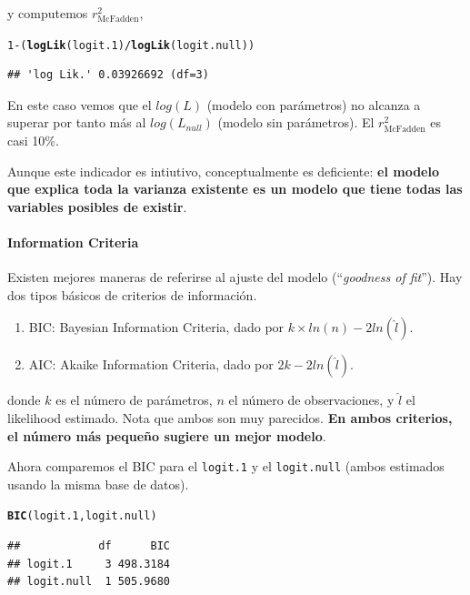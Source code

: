 \documentclass[onesided]{article}\usepackage[]{graphicx}\usepackage[]{color}
\makeatletter
\newcommand{\hlnum}[1]{\textcolor[rgb]{0.686,0.059,0.569}{#1}}%
\newcommand{\hlopt}[1]{\textcolor[rgb]{0,0,0}{#1}}%
\newcommand{\hlstd}[1]{\textcolor[rgb]{0.345,0.345,0.345}{#1}}%
\newcommand{\hlkwd}[1]{\textcolor[rgb]{0.737,0.353,0.396}{\textbf{#1}}}%
\newenvironment{kframe}{%
 \def\at@end@of@kframe{}%
 \ifinner\ifhmode%
  \def\at@end@of@kframe{\end{minipage}}%
  \begin{minipage}{\columnwidth}%
 \fi\fi%
 \def\FrameCommand##1{\hskip\@totalleftmargin \hskip-\fboxsep
 \colorbox{shadecolor}{##1}\hskip-\fboxsep
     \hskip-\linewidth \hskip-\@totalleftmargin \hskip\columnwidth}%
 \MakeFramed {\advance\hsize-\width
   \@totalleftmargin\z@ \linewidth\hsize
   \@setminipage}}%
 {\par\unskip\endMakeFramed%
 \at@end@of@kframe}
\newenvironment{knitrout}{}{} %
\makeatother
\begin{document}
y computemos $r^{2}_{\text{McFadden}}$,

\begin{knitrout}
\color{fgcolor}\begin{kframe}
\begin{alltt}
\hlnum{1}\hlopt{-}\hlstd{(}\hlkwd{logLik}\hlstd{(logit.1)}\hlopt{/}\hlkwd{logLik}\hlstd{(logit.null))}
\end{alltt}
\begin{verbatim}
## 'log Lik.' 0.03926692 (df=3)
\end{verbatim}
\end{kframe}
\end{knitrout}

En este caso vemos que el $log(L)$ (modelo con par\'ametros) no alcanza a superar por tanto m\'as al $log(L_{null})$ (modelo sin par\'ametros). El $r^{2}_{\text{McFadden}}$ es casi 10\%. 

Aunque este indicador es intiutivo, conceptualmente es deficiente: {\bf el modelo que explica toda la varianza existente es un modelo que tiene todas las variables posibles de existir}. 


\paragraph{Information Criteria} Existen mejores maneras de referirse al ajuste del modelo (``\emph{goodness of fit}''). Hay dos tipos b\'asicos de criterios de informaci\'on. 

\begin{enumerate}
  \item BIC: Bayesian Information Criteria, dado por $k\times ln(n)-2ln(\hat{l})$.
  \item AIC: Akaike Information Criteria, dado por $2k-2ln(\hat{l})$.
\end{enumerate}

donde $k$ es el n\'umero de par\'ametros, $n$ el n\'umero de observaciones, y $\hat{l}$ el likelihood estimado. Nota que ambos son muy parecidos. {\bf En ambos criterios, el n\'umero m\'as peque\~no sugiere un mejor modelo}. 

Ahora comparemos el BIC para el \texttt{logit.1} y el \texttt{logit.null} (ambos estimados usando la misma base de datos). 

\begin{knitrout}
\color{fgcolor}\begin{kframe}
\begin{alltt}
\hlkwd{BIC}\hlstd{(logit.1,logit.null)}
\end{alltt}
\begin{verbatim}
##            df      BIC
## logit.1     3 498.3184
## logit.null  1 505.9680
\end{verbatim}
\end{kframe}
\end{knitrout}
\end{document}
